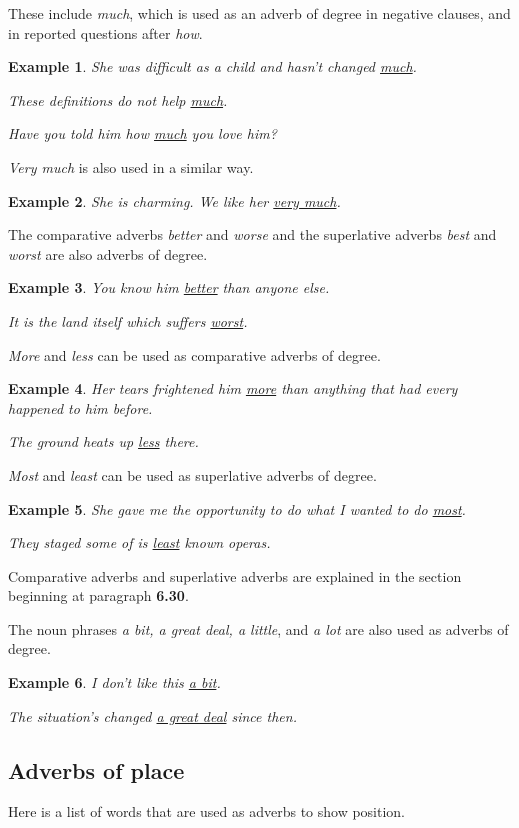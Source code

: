 \documentclass[oneside]{book}
\numberwithin{equation}{section}
\newtheorem{example}{Example}[section]
\begin{document}
These include \textit{much}, which is used as an adverb of degree in negative clauses, and in reported questions after \textit{how}.
\begin{example}
    She was difficult as a child and hasn't changed \underline{much}.
    
    These definitions do not help \underline{much}.
    
    Have you told him how \underline{much} you love him?
\end{example}
\textit{Very much} is also used in a similar way.
\begin{example}
    She is charming. We like her \underline{very much}.
\end{example}
The comparative adverbs \textit{better} and \textit{worse} and the superlative adverbs \textit{best} and \textit{worst} are also adverbs of degree.
\begin{example}
    You know him \underline{better} than anyone else.
    
    It is the land itself which suffers \underline{worst}.
\end{example}
\textit{More} and \textit{less} can be used as comparative adverbs of degree.
\begin{example}
    Her tears frightened him \underline{more} than anything that had every happened to him before.
    
    The ground heats up \underline{less} there.
\end{example}
\textit{Most} and \textit{least} can be used as superlative adverbs of degree.
\begin{example}
    She gave me the opportunity to do what I wanted to do \underline{most}.
    
    They staged some of is \underline{least} known operas.
\end{example}
Comparative adverbs and superlative adverbs are explained in the section beginning at paragraph \textbf{6.30}.

%
The noun phrases \textit{a bit, a great deal, a little}, and \textit{a lot} are also used as adverbs of degree.
\begin{example}
    I don't like this \underline{a bit}.
    
    The situation's changed \underline{a great deal} since then.
\end{example}

\subsection{Adverbs of place}
\noindent{} Here is a list of words that are used as adverbs to show position.
\end{document}
